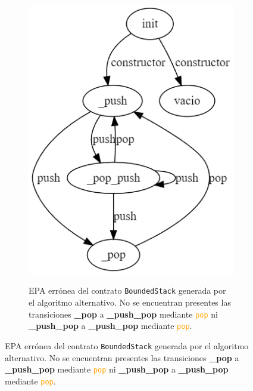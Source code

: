 \begin{figure}
\begin{subfigure}{0.45\textwidth}
        {\includegraphics[width=\textwidth]{figs/bonded-stack-bad-epa.png}}
        \caption{EPA errónea del contrato \texttt{BoundedStack} generada por el algoritmo alternativo.
            No se encuentran presentes las transiciones \textbf{\_pop} a \textbf{\_push\_pop} mediante \textcolor{orange}{\texttt{pop}} ni \textbf{\_push\_pop} a \textbf{\_push\_pop} mediante \textcolor{orange}{\texttt{pop}}.}
        \label{fig:bounded-stack-bad-epa}
    \end{subfigure}
\end{figure}
